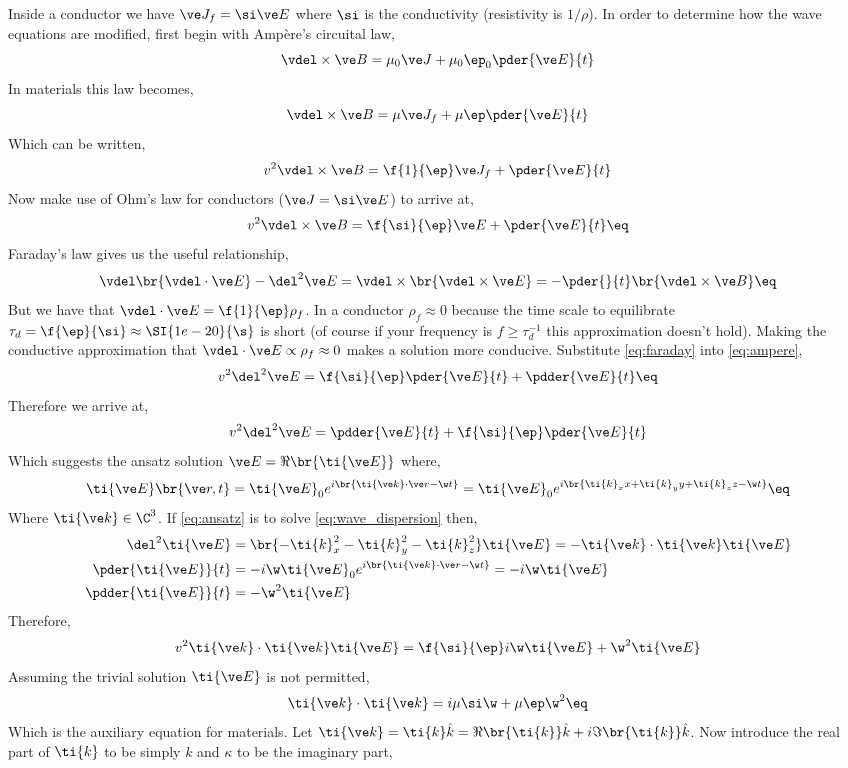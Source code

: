 \documentclass{article}
\begin{document}
Inside a conductor we have $\ve J_f = \si \ve E$ where $\si$ is the conductivity (resistivity is $1/\rho$). In order to determine how the wave equations are modified, first begin with Ampère's circuital law,
\[ \vdel \times \ve B = \mu_0 \ve J + \mu_0 \ep_0 \pder{\ve E}{t} \]
In materials this law becomes,
\[ \vdel \times \ve B = \mu \ve J_f + \mu \ep \pder{\ve E}{t} \]
Which can be written,
\[ v^2 \vdel \times \ve B = \f{1}{\ep} \ve J_f + \pder{\ve E}{t} \]
Now make use of Ohm's law for conductors ($\ve J = \si \ve E$) to arrive at,
\[ v^2 \vdel \times \ve B = \f{\si}{\ep} \ve E + \pder{\ve E}{t} \eq \label{eq:ampere}\]
Faraday's law gives us the useful relationship,
\[ \vdel\br{\vdel \cdot \ve E} - \del^2 \ve E = \vdel \times \br{\vdel \times \ve E} = - \pder{}{t}\br{\vdel \times \ve B} \eq \label{eq:faraday} \]
But we have that $\vdel \cdot \ve E = \f{1}{\ep} \rho_{f}$. In a conductor $\rho_{f} \approx 0$ because the time scale to equilibrate $\tau_{d} = \f{\ep}{\si} \approx \SI{1e-20}{\s}$ is short (of course if your frequency is $f \geq \tau_d^{-1}$ this approximation doesn't hold). Making the conductive approximation that $\vdel \cdot \ve E \propto \rho_f \approx 0$ makes a solution more conducive. Substitute \cref{eq:faraday} into \cref{eq:ampere},
\[ v^2 \del^2 \ve E = \f{\si}{\ep} \pder{\ve E}{t} + \pdder{\ve E}{t} \eq \label{eq:wave_dispersion} \]
Therefore we arrive at,
\[ v^2 \del^2 \ve E = \pdder{\ve E}{t} + \f{\si}{\ep} \pder{\ve E}{t} \]
Which suggests the ansatz solution $\ve E = \Re\br{\ti{\ve E}}$ where,
\[ \ti{\ve E} \br{\ve r, t} = \ti{\ve E}_0 e^{i\br{\ti{\ve k}\cdot \ve r - \w t}} = \ti{\ve E}_0 e^{i\br{\ti{k}_x x + \ti{k}_y y + \ti{k}_z z - \w t}} \eq \label{eq:ansatz}\]
Where $\ti{\ve k} \in \C^3$. If \cref{eq:ansatz} is to solve \cref{eq:wave_dispersion} then,
\begin{align*}
    \del^2 \ti{\ve E} &= \br{-\ti{k}_x^2 -\ti{k}_y^2 -\ti{k}_z^2} \ti{\ve E} = -\ti{\ve k}\cdot\ti{\ve k} \ti{\ve E}\\
    \pder{\ti{\ve E}}{t} &= -i\w \ti{\ve E}_0 e^{i\br{\ti{\ve k}\cdot \ve r - \w t}} = - i\w \ti{\ve E} \\
    \pdder{\ti{\ve E}}{t} &= -\w^2 \ti{\ve E}
\end{align*}
Therefore,
\[ v^2 \ti{\ve k}\cdot\ti{\ve k} \ti{\ve E} = \f{\si}{\ep} i\w \ti{\ve E} + \w^2 \ti{\ve E} \]
Assuming the trivial solution $\ti{\ve E}$ is not permitted,
\[ \ti{\ve k}\cdot\ti{\ve k} = i \mu \si \w + \mu \ep \w^2 \eq \label{eq:aux}\]
Which is the auxiliary equation for materials. Let $\ti{\ve k} = \ti{k} \hat k = \Re\br{\ti{k}} \hat k + i\Im\br{\ti{k}} \hat k$. Now introduce the real part of $\ti{k}$ to be simply $k$ and $\kappa$ to be the imaginary part,
\end{document}
